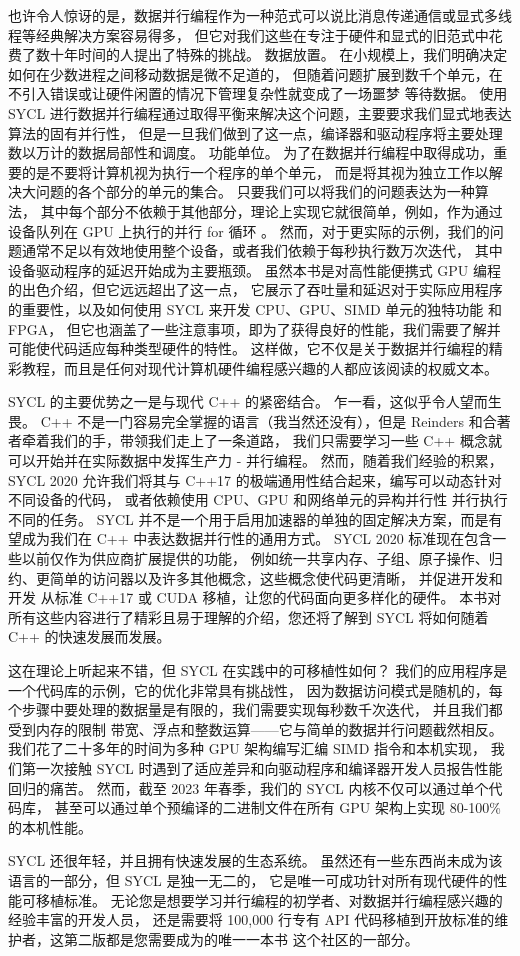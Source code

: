 也许令人惊讶的是，数据并行编程作为一种范式可以说比消息传递通信或显式多线程等经典解决方案容易得多，
但它对我们这些在专注于硬件和显式的旧范式中花费了数十年时间的人提出了特殊的挑战。 
数据放置。 在小规模上，我们明确决定如何在少数进程之间移动数据是微不足道的，
但随着问题扩展到数千个单元，在不引入错误或让硬件闲置的情况下管理复杂性就变成了一场噩梦 等待数据。 
使用 SYCL 进行数据并行编程通过取得平衡来解决这个问题，主要要求我们显式地表达算法的固有并行性，
但是一旦我们做到了这一点，编译器和驱动程序将主要处理数以万计的数据局部性和调度。 功能单位。 
为了在数据并行编程中取得成功，重要的是不要将计算机视为执行一个程序的单个单元，
而是将其视为独立工作以解决大问题的各个部分的单元的集合。 只要我们可以将我们的问题表达为一种算法，
其中每个部分不依赖于其他部分，理论上实现它就很简单，例如，作为通过设备队列在 GPU 上执行的并行 for 循环 。 
然而，对于更实际的示例，我们的问题通常不足以有效地使用整个设备，或者我们依赖于每秒执行数万次迭代，
其中设备驱动程序的延迟开始成为主要瓶颈。 虽然本书是对高性能便携式 GPU 编程的出色介绍，但它远远超出了这一点，
它展示了吞吐量和延迟对于实际应用程序的重要性，以及如何使用 SYCL 来开发 CPU、GPU、SIMD 单元的独特功能 和 FPGA，
但它也涵盖了一些注意事项，即为了获得良好的性能，我们需要了解并可能使代码适应每种类型硬件的特性。 
这样做，它不仅是关于数据并行编程的精彩教程，而且是任何对现代计算机硬件编程感兴趣的人都应该阅读的权威文本。

SYCL 的主要优势之一是与现代 C++ 的紧密结合。 乍一看，这似乎令人望而生畏。 
C++ 不是一门容易完全掌握的语言（我当然还没有），但是 Reinders 和合著者牵着我们的手，带领我们走上了一条道路，
我们只需要学习一些 C++ 概念就可以开始并在实际数据中发挥生产力 - 并行编程。 
然而，随着我们经验的积累，SYCL 2020 允许我们将其与 C++17 的极端通用性结合起来，编写可以动态针对不同设备的代码，
或者依赖使用 CPU、GPU 和网络单元的异构并行性 并行执行不同的任务。 
SYCL 并不是一个用于启用加速器的单独的固定解决方案，而是有望成为我们在 C++ 中表达数据并行性的通用方式。 
SYCL 2020 标准现在包含一些以前仅作为供应商扩展提供的功能，
例如统一共享内存、子组、原子操作、归约、更简单的访问器以及许多其他概念，这些概念使代码更清晰，
并促进开发和开发 从标准 C++17 或 CUDA 移植，让您的代码面向更多样化的硬件。 
本书对所有这些内容进行了精彩且易于理解的介绍，您还将了解到 SYCL 将如何随着 C++ 的快速发展而发展。

这在理论上听起来不错，但 SYCL 在实践中的可移植性如何？ 我们的应用程序是一个代码库的示例，它的优化非常具有挑战性，
因为数据访问模式是随机的，每个步骤中要处理的数据量是有限的，我们需要实现每秒数千次迭代，
并且我们都受到内存的限制 带宽、浮点和整数运算——它与简单的数据并行问题截然相反。 
我们花了二十多年的时间为多种 GPU 架构编写汇编 SIMD 指令和本机实现，
我们第一次接触 SYCL 时遇到了适应差异和向驱动程序和编译器开发人员报告性能回归的痛苦。 
然而，截至 2023 年春季，我们的 SYCL 内核不仅可以通过单个代码库，
甚至可以通过单个预编译的二进制文件在所有 GPU 架构上实现 80-100\% 的本机性能。

SYCL 还很年轻，并且拥有快速发展的生态系统。 虽然还有一些东西尚未成为该语言的一部分，但 SYCL 是独一无二的，
它是唯一可成功针对所有现代硬件的性能可移植标准。 
无论您是想要学习并行编程的初学者、对数据并行编程感兴趣的经验丰富的开发人员，
还是需要将 100,000 行专有 API 代码移植到开放标准的维护者，这第二版都是您需要成为的唯一一本书 这个社区的一部分。
